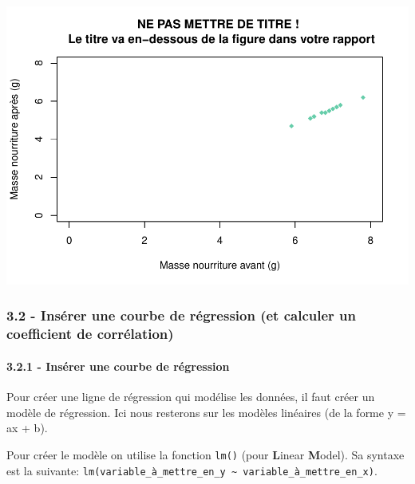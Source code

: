 \documentclass[
]{article}
\newenvironment{Shaded}{\begin{snugshade}}{\end{snugshade}}
\newcommand{\CommentTok}[1]{\textcolor[rgb]{0.56,0.35,0.01}{\textit{#1}}}
\newcommand{\KeywordTok}[1]{\textcolor[rgb]{0.13,0.29,0.53}{\textbf{#1}}}
\newcommand{\NormalTok}[1]{#1}
\newcommand{\OperatorTok}[1]{\textcolor[rgb]{0.81,0.36,0.00}{\textbf{#1}}}
\newcommand{\StringTok}[1]{\textcolor[rgb]{0.31,0.60,0.02}{#1}}
\begin{document}
\includegraphics{Utilisation_R_base_files/figure-latex/unnamed-chunk-8-1.pdf}

\hypertarget{insuxe9rer-une-courbe-de-ruxe9gression-et-calculer-un-coefficient-de-corruxe9lation}{%
\subsubsection{3.2 - Insérer une courbe de régression (et calculer un
coefficient de
corrélation)}\label{insuxe9rer-une-courbe-de-ruxe9gression-et-calculer-un-coefficient-de-corruxe9lation}}

\hypertarget{insuxe9rer-une-courbe-de-ruxe9gression}{%
\paragraph{3.2.1 - Insérer une courbe de
régression}\label{insuxe9rer-une-courbe-de-ruxe9gression}}

Pour créer une ligne de régression qui modélise les données, il faut
créer un modèle de régression. Ici nous resterons sur les modèles
linéaires (de la forme y = ax + b).

Pour créer le modèle on utilise la fonction \texttt{lm()} (pour
\textbf{L}inear \textbf{M}odel). Sa syntaxe est la suivante:
\texttt{lm(variable\_à\_mettre\_en\_y\ \textasciitilde{}\ variable\_à\_mettre\_en\_x)}.

\begin{Shaded}
\end{Shaded}
\end{document}
